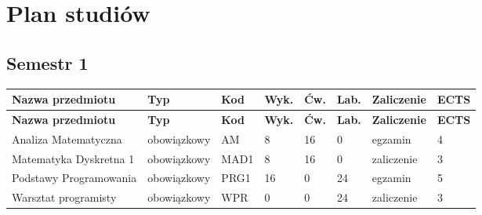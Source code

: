 \documentclass[12pt,a4paper]{article}
\newcommand{\thdrule}{\noalign{\global\setlength{\extrarowheight}{0pt}}}
\newcommand{\thdend}{\noalign{\global\setlength{\extrarowheight}{4pt}}}
\begin{document}
\newpage

\section{Plan studiów}


\bigskip

\subsection*{Semestr 1}

{\scriptsize
\begin{longtable}{m{5.0cm}m{1.9cm}m{0.75cm}m{0.85cm}m{0.85cm}m{0.85cm}m{1.45cm}m{0.9cm}}
\thdrule\toprule
\rowcolor{pjatkRed}
{\color{white}\footnotesize\textbf{\vphantom{Ag}Nazwa przedmiotu}} & {\color{white}\footnotesize\textbf{\vphantom{Ag}Typ}} & {\color{white}\footnotesize\textbf{\vphantom{Ag}Kod}} & {\color{white}\footnotesize\textbf{\vphantom{Ag}Wyk.}} & {\color{white}\footnotesize\textbf{\vphantom{Ag}Ćw.}} & {\color{white}\footnotesize\textbf{\vphantom{Ag}Lab.}} & {\color{white}\footnotesize\textbf{\vphantom{Ag}Zaliczenie}} & {\color{white}\footnotesize\textbf{\vphantom{Ag}ECTS}} \\
\midrule\thdend
\endfirsthead
\thdrule\toprule
\rowcolor{pjatkRed}
{\color{white}\footnotesize\textbf{\vphantom{Ag}Nazwa przedmiotu}} & {\color{white}\footnotesize\textbf{\vphantom{Ag}Typ}} & {\color{white}\footnotesize\textbf{\vphantom{Ag}Kod}} & {\color{white}\footnotesize\textbf{\vphantom{Ag}Wyk.}} & {\color{white}\footnotesize\textbf{\vphantom{Ag}Ćw.}} & {\color{white}\footnotesize\textbf{\vphantom{Ag}Lab.}} & {\color{white}\footnotesize\textbf{\vphantom{Ag}Zaliczenie}} & {\color{white}\footnotesize\textbf{\vphantom{Ag}ECTS}} \\
\midrule\thdend
\endhead
\rowcolor{tableRowLight} Analiza Matematyczna & {\scriptsize obowiązkowy} & AM & 8 & 16 & 0 & {\scriptsize egzamin} & 4 \\
\rowcolor{tableRowAlt} Matematyka Dyskretna 1 & {\scriptsize obowiązkowy} & MAD1 & 8 & 16 & 0 & {\scriptsize zaliczenie} & 3 \\
\rowcolor{tableRowLight} Podstawy Programowania & {\scriptsize obowiązkowy} & PRG1 & 16 & 0 & 24 & {\scriptsize egzamin} & 5 \\
\rowcolor{tableRowAlt} Warsztat programisty & {\scriptsize obowiązkowy} & WPR & 0 & 0 & 24 & {\scriptsize zaliczenie} & 3 \\

\end{longtable}}
\end{document}
